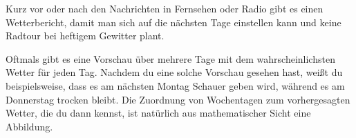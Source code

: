 \documentclass[../../main.tex]{subfiles}
\begin{document}
\begin{example}{}
    Kurz vor oder nach den Nachrichten in Fernsehen oder Radio gibt es einen Wetterbericht, damit man sich auf die nächsten Tage einstellen kann und keine Radtour bei heftigem Gewitter plant.
    
    Oftmals gibt es eine Vorschau über mehrere Tage mit dem wahrscheinlichsten Wetter für jeden Tag. Nachdem du eine solche Vorschau gesehen hast, weißt du beispielsweise, dass es am nächsten Montag Schauer geben wird, während es am Donnerstag trocken bleibt. Die Zuordnung von Wochentagen zum vorhergesagten Wetter, die du dann kennst, ist natürlich aus mathematischer Sicht eine Abbildung.
    

\end{example}
\end{document}
